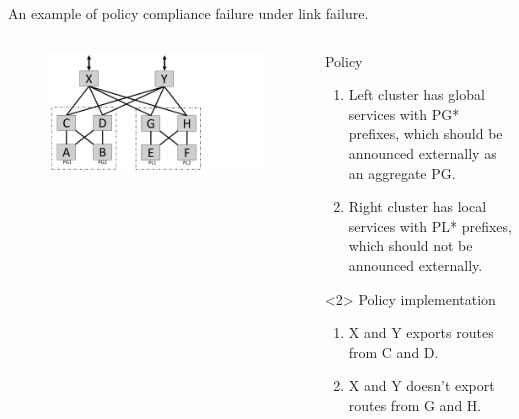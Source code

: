 \begin{frame}{An example of policy compliance failure under link failure.}
    \begin{columns}
        \begin{column}{0.45\textwidth}
            \begin{figure}
                \includegraphics[width=1\textwidth,keepaspectratio,clip,trim={0cm 0cm 9cm 0cm}]{figures/ex2_clean.pdf}
            \end{figure}
        \end{column}
        \begin{column}{0.50\textwidth}
            \begin{block}{Policy}
                \begin{enumerate}
                    \item Left cluster has global services with PG* prefixes, which should be announced externally as an aggregate PG.
                    \item Right cluster has local services with PL* prefixes, which should not be announced externally.
                \end{enumerate}
            \end{block}
            \begin{block}<2>    {Policy implementation}
                \begin{enumerate}
                    \item X and Y exports routes from C and D.
                    \item X and Y doesn't export routes from G and H.
                \end{enumerate}
            \end{block}
        \end{column}
    \end{columns}
\end{frame}

